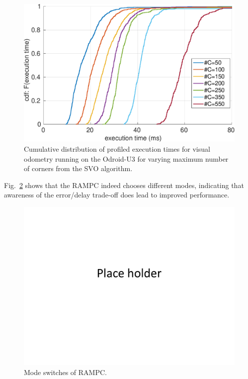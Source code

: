 \begin{figure}[htbp]
  \centering
  \includegraphics[width=0.9\columnwidth]{figures/time_ecdf_millisec.pdf}
  \caption{Cumulative distribution of profiled execution times for visual odometry running on the Odroid-U3 for varying maximum number of corners from the SVO algorithm.}
  \label{fig:time_ecdf}
\end{figure}

Fig.~\ref{fig:modeSwitching} shows that the RAMPC indeed chooses different modes, indicating that awareness of the error/delay trade-off does lead to improved performance.
\begin{figure}[t]
	\centering
	\includegraphics[width=0.9\columnwidth]{figures/placeHolder}
	\caption{Mode switches of RAMPC.}
	\label{fig:modeSwitching}
\end{figure}






